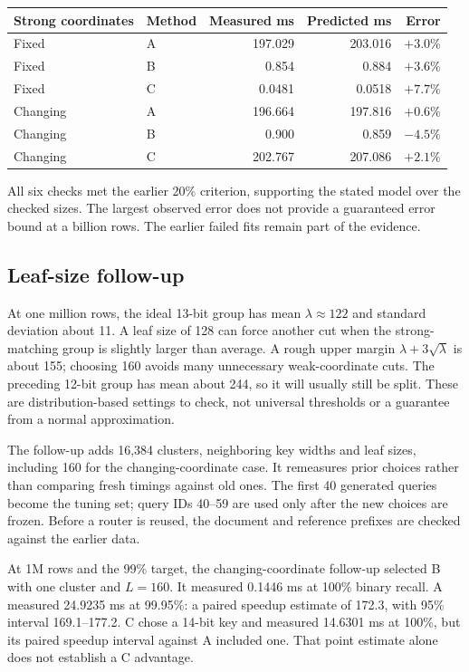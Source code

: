 \begin{center}\small
\begin{tabular}{@{}llrrr@{}}\toprule
Strong coordinates & Method & Measured ms & Predicted ms & Error\\\midrule
Fixed & A & 197.029 & 203.016 & $+3.0\%$\\
Fixed & B & 0.854 & 0.884 & $+3.6\%$\\
Fixed & C & 0.0481 & 0.0518 & $+7.7\%$\\
Changing & A & 196.664 & 197.816 & $+0.6\%$\\
Changing & B & 0.900 & 0.859 & $-4.5\%$\\
Changing & C & 202.767 & 207.086 & $+2.1\%$\\\bottomrule
\end{tabular}\normalsize\end{center}
All six checks met the earlier 20\% criterion, supporting the stated model over the checked
sizes. The largest observed error does not provide a guaranteed error bound at a billion
rows. The earlier failed fits remain part of the evidence.

\subsection{Leaf-size follow-up}
At one million rows, the ideal 13-bit group has mean $\lambda\approx122$ and standard deviation
about 11. A leaf size of 128 can force another cut when the strong-matching group is slightly
larger than average. A rough upper margin $\lambda+3\sqrt{\lambda}$ is about 155; choosing 160
avoids many unnecessary weak-coordinate cuts. The preceding 12-bit group has mean about 244,
so it will usually still be split. These are distribution-based settings to check, not universal
thresholds or a guarantee from a normal approximation.

The follow-up adds 16,384 clusters, neighboring key widths and leaf sizes, including
160 for the changing-coordinate case. It remeasures prior choices rather than comparing fresh
timings against old ones. The first 40 generated queries become the tuning set; query IDs
40--59 are used only after the new choices are frozen. Before a router is reused, the document and reference prefixes are checked against the earlier data.

At 1M rows and the 99\% target, the changing-coordinate follow-up selected B with one cluster
and $L=160$. It measured 0.1446 ms at 100\% binary recall. A measured 24.9235 ms at 99.95\%:
a paired speedup estimate of 172.3, with 95\% interval 169.1--177.2. C chose a 14-bit key and
measured 14.6301 ms at 100\%, but its paired speedup interval against A included one. That
point estimate alone does not establish a C advantage.

